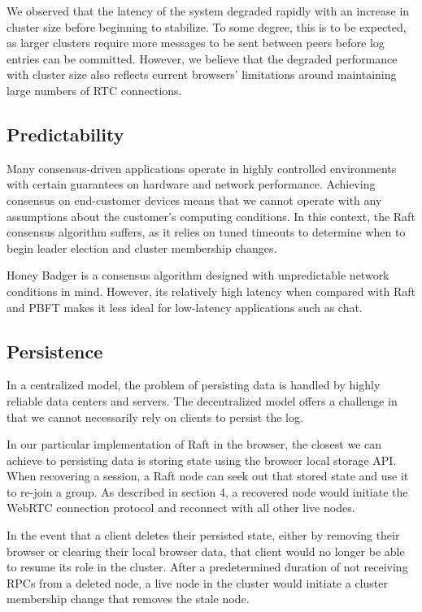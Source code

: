 \documentclass[11pt,twocolumn]{article}
\begin{document}
We observed that the latency of the system degraded rapidly with an increase in cluster size before beginning to stabilize. To some degree, this is to be expected, as larger clusters require more messages to be sent between peers before log entries can be committed. However, we believe that the degraded performance with cluster size also reflects current browsers' limitations around maintaining large numbers of RTC connections.

\subsection{Predictability}
Many consensus-driven applications operate in highly controlled environments with certain guarantees on hardware and network performance. Achieving consensus on end-customer devices means that we cannot operate with any assumptions about the customer's computing conditions. In this context, the Raft consensus algorithm suffers, as it relies on tuned timeouts to determine when to begin leader election and cluster membership changes.

Honey Badger is a consensus algorithm designed with unpredictable network conditions in mind. However, its relatively high latency when compared with Raft and PBFT makes it less ideal for low-latency applications such as chat.

\subsection{Persistence}
In a centralized model, the problem of persisting data is handled by highly reliable data centers and servers. The decentralized model offers a challenge in that we cannot necessarily rely on clients to persist the log.

In our particular implementation of Raft in the browser, the closest we can achieve to persisting data is storing state using the browser local storage API. When recovering a session, a Raft node can seek out that stored state and use it to re-join a group. As described in section 4, a recovered node would initiate the WebRTC connection protocol and reconnect with all other live nodes.

In the event that a client deletes their persisted state, either by removing their browser or clearing their local browser data, that client would no longer be able to resume its role in the cluster. After a predetermined duration of not receiving RPCs from a deleted node, a live node in the cluster would initiate a cluster membership change that removes the stale node.
\end{document}
